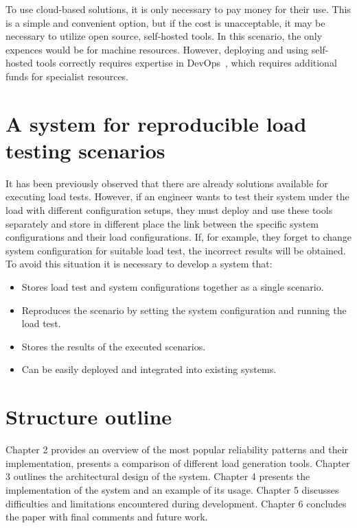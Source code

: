 To use cloud-based solutions, it is only necessary to pay money for their use. This is a simple and convenient option, but if the cost is unacceptable, it may be necessary to utilize open source, self-hosted tools. In this scenario, the only expences would be for machine resources. However, deploying and using self-hosted tools correctly requires expertise in DevOps~\cite{devops}, which requires additional funds for specialist resources.


\section{A system for reproducible load testing scenarios}\label{sec:purpose}
It has been previously observed that there are already solutions available for executing load tests. However, if an engineer wants to test their system under the load with different configuration setups, they must deploy and use these tools separately and store in different place the link between the specific system configurations and their load configurations. If, for example, they forget to change system configuration for suitable load test, the incorrect results will be obtained. To avoid this situation it is necessary to develop a system that:
\begin{itemize}
    \item Stores load test and system configurations together as a single scenario.
    \item Reproduces the scenario by setting the system configuration and running the load test.
    \item Stores the results of the executed scenarios.
    \item Can be easily deployed and integrated into existing systems.
\end{itemize}


\section{Structure outline}\label{sec:structure-outline}
Chapter 2 provides an overview of the most popular reliability patterns and their implementation, presents a comparison of different load generation tools. Chapter 3 outlines the architectural design of the system. Chapter 4 presents the implementation of the system and an example of its usage. Chapter 5 discusses difficulties and limitations encountered during development. Chapter 6 concludes the paper with final comments and future work.